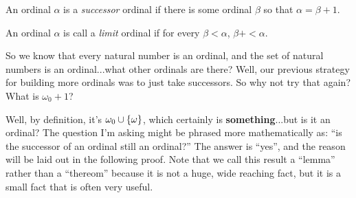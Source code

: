 \begin{definition}
    An ordinal $\alpha$ is a \emph{successor} ordinal if there is some ordinal $\beta$ so that $\alpha = \beta + 1$.
\end{definition}

\begin{definition}
    An ordinal $\alpha$ is call a \emph{limit} ordinal if for every $\beta < \alpha$, $\beta + < \alpha$.
\end{definition}

So we know that every natural number is an ordinal, and the set of natural numbers is an ordinal...what other ordinals are there?
Well, our previous strategy for building more ordinals was to just take successors.
So why not try that again?
What is $\omega_0 + 1$?

Well, by definition, it's $\omega_0 \cup {\left\{ {\omega} \right\}}$, which certainly is \textbf{something}...but is it an ordinal?
The question I'm asking might be phrased more mathematically as: ``is the successor of an ordinal still an ordinal?''
The answer is ``yes'', and the reason will be laid out in the following proof.
Note that we call this result a ``lemma'' rather than a ``thereom'' because it is not a huge, wide reaching fact, but it is a small fact that is often very useful. 

